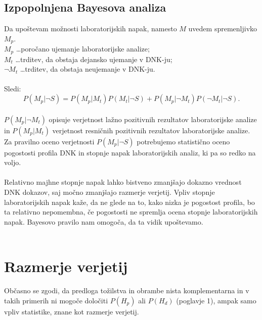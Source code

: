 \documentclass[12pt,a4paper]{amsart}
\theoremstyle{definition} %
\theoremstyle{plain} %
\begin{document}
\subsection{Izpopolnjena Bayesova analiza}
Da upoštevam možnosti laboratorijskih napak, namesto $M$ uvedem spremenljivko $M_p$.\\
$M_p$ \dots poročano ujemanje laboratorijske analize; \\
$M_t$ \dots trditev, da obstaja dejansko ujemanje v DNK-ju;\\
$\neg M_t$ \dots trditev, da obstaja neujemanje v DNK-ju.\\\\
Sledi:
\[
   P(M_p \lvert \neg S) = P(M_p \lvert M_t)P(M_t \lvert \neg S) + P(M_p \lvert \neg M_t)P(\neg M_t \lvert \neg S).
\]\\
$P(M_p \lvert \neg M_t)$ opisuje verjetnost lažno pozitivnih rezultatov laboratorijske analize in $P(M_p \lvert M_t)$ verjetnost resničnih 
pozitivnih rezultatov laboratorijske analize.\\
Za pravilno oceno verjetnosti $P(M_p \lvert \neg S)$ potrebujemo statistično oceno pogostosti profila DNK in stopnje napak
laboratorijskih analiz, ki pa so redko na voljo.\\\\
Relativno majhne stopnje napak lahko bistveno zmanjšajo dokazno vrednost DNK dokazov, saj močno zmanjšajo razmerje verjetij. Vpliv stopnje 
laboratorijskih napak kaže, da ne glede na to, kako nizka je pogostost profila, bo ta relativno nepomembna, če pogostosti ne spremlja ocena 
stopnje laboratorijskih napak. Bayesovo pravilo nam omogoča, da ta vidik upoštevamo.\\\\

\section{Razmerje verjetij}
Občasno se zgodi, da predloga tožilstva in obrambe nista komplementarna in v takih primerih ni mogoče določiti $P(H_p)$ ali $P(H_d)$ (poglavje 1), 
ampak samo vpliv statistike, znane kot razmerje verjetij.
\end{document}
